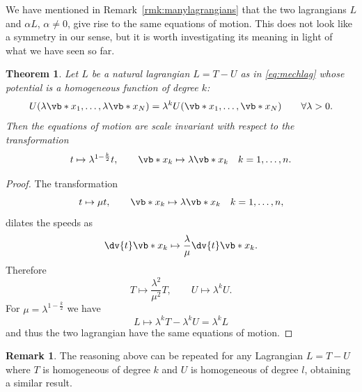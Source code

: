 \documentclass[english,fontsize=11pt,paper=b5]{scrbook}
\numberwithin{equation}{chapter}
\newtheorem{theorem}{Theorem}[chapter]
\theoremstyle{definition}
\newtheorem{remark}{Remark}[chapter]
\begin{document}
    We have mentioned in Remark~\ref{rmk:manylagrangians} that the two lagrangians $L$ and $\alpha L$, $\alpha\neq0$, give rise to the same equations of motion.
    This does not look like a symmetry in our sense, but it is worth investigating its meaning in light of what we have seen so far.

    \begin{theorem}
      Let $L$ be a natural lagrangian $L=T-U$ as in \eqref{eq:mechlag} whose potential is a homogeneous function of degree $k$:
      \begin{equation}
        U(\lambda\vb*{x}_1, \ldots, \lambda\vb*{x}_N) = \lambda^k U(\vb*{x}_1, \ldots, \vb*{x}_N)
        \qquad\forall \lambda>0.
      \end{equation}
      Then the equations of motion are scale invariant with respect to the transformation
      \begin{equation}
        t \mapsto \lambda^{1-\frac{k}2} t, \qquad
        \vb*{x}_k \mapsto \lambda\vb*{x}_k \quad k=1,\ldots,n.
      \end{equation}
    \end{theorem}
    \begin{proof}
      The transformation
      \begin{equation}
        t \mapsto \mu t, \qquad
        \vb*{x}_k \mapsto \lambda\vb*{x}_k \quad k=1,\ldots,n,
      \end{equation}
      dilates the speeds as
      \begin{equation}
        \dv{t} \vb*{x}_k \mapsto \frac{\lambda}{\mu} \dv{t}\vb*{x}_k.
      \end{equation}
      Therefore
      \begin{equation}
        T \mapsto \frac{\lambda^2}{\mu^2} T, \qquad U \mapsto \lambda^k U.
      \end{equation}
      For $\mu = \lambda^{1-\frac{k}2}$ we have
      \begin{equation}
        L \mapsto \lambda^k T - \lambda^k U = \lambda^k L
      \end{equation}
      and thus the two lagrangian have the same equations of motion.
    \end{proof}

    \begin{remark}
      The reasoning above can be repeated for any Lagrangian $L = T - U$ where $T$ is homogeneous of degree $k$ and $U$ is homogeneous of degree $l$, obtaining a similar result.
    \end{remark}
\end{document}
